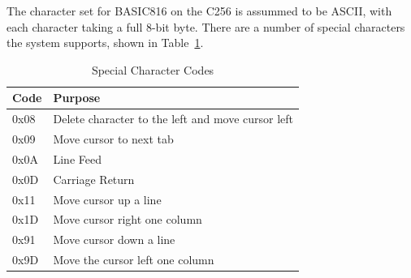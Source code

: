 \documentclass{report}
\begin{document}
    The character set for BASIC816 on the C256 is assummed to be ASCII, with each character taking a full 8-bit byte.
    There are a number of special characters the system supports, shown in Table~\ref{char_codes}.


    \begin{table}[!htb]
        \begin{center}
            \begin{tabular}{|l|l|} \hline
                Code & Purpose \\ \hline\hline
                0x08 & Delete character to the left and move cursor left \\ \hline
                0x09 & Move cursor to next tab \\ \hline
                0x0A & Line Feed \\ \hline
                0x0D & Carriage Return \\ \hline
                0x11 & Move cursor up a line \\ \hline
                0x1D & Move cursor right one column \\ \hline
                0x91 & Move cursor down a line \\ \hline
                0x9D & Move the cursor left one column \\ \hline
            \end{tabular}
            \caption{Special Character Codes}
            \label{char_codes}
        \end{center}
    \end{table}
\end{document}
